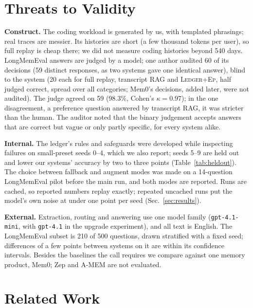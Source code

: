 \documentclass[10pt,conference]{IEEEtran}
\newcommand{\hyb}{\textsc{Ledger+Ep}}
\begin{document}
\section{Threats to Validity}
\label{sec:threats}

\textbf{Construct.} The coding workload is generated by us, with templated
phrasings; real traces are messier. Its histories are short (a few thousand
tokens per user), so full replay is cheap there; we did not measure coding
histories beyond 540 days. LongMemEval answers are judged by a model; one
author audited 60 of its decisions (59 distinct responses, as two systems gave
one identical answer), blind to the system (20 each for full replay,
transcript RAG and \hyb{}, half judged correct, spread over all categories;
Mem0's decisions, added later, were not audited).
The judge agreed on 59 (98.3\%, Cohen's $\kappa=0.97$); in the one
disagreement, a preference question answered by transcript RAG, it was
stricter than the human. The auditor noted that the binary judgement accepts
answers that are correct but vague or only partly specific, for every system
alike.

\textbf{Internal.} The ledger's rules and safeguards were developed while
inspecting failures on small-preset seeds 0--4, which we also report; seeds
5--9 are held out and lower our systems' accuracy by two to three points
(Table~\ref{tab:heldout}). The
choice between fallback and augment modes was made on a 14-question
LongMemEval pilot before the main run, and both modes are reported. Runs are
cached, so reported numbers replay exactly; repeated uncached runs put the
model's own noise at under one point per seed (Sec.~\ref{sec:results}).

\textbf{External.} Extraction, routing and answering use one model family
(\texttt{gpt-4.1-mini}, with \texttt{gpt-4.1} in the upgrade experiment), and
all text is English. The LongMemEval subset is 210 of 500 questions, drawn
stratified with a fixed seed; differences of a few points between systems on
it are within its confidence intervals. Besides the baselines the call
requires we compare against one memory product, Mem0; Zep and A-MEM are not
evaluated.

\section{Related Work}
\end{document}
